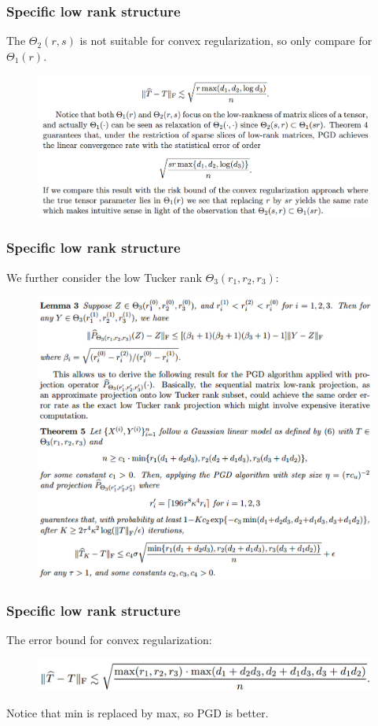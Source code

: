 \documentclass{beamer}
\begin{document}
	\begin{frame}
		\frametitle{Specific low rank structure}
		The $\Theta_2(r,s)$ is not suitable for convex regularization, so only compare for $\Theta_1(r)$.
		\begin{figure}
			\includegraphics[width=1\linewidth]{image029.png}
		\end{figure}
	\end{frame}
	
	\begin{frame}
		\frametitle{Specific low rank structure}
		We further consider the low Tucker rank $\Theta_3(r_1, r_2, r_3)$:
		\begin{figure}
			\includegraphics[width=.7\linewidth]{image030.png}
		\end{figure}
	\end{frame}
	
	
	\begin{frame}
		\frametitle{Specific low rank structure}
		The error bound for convex regularization:
		\begin{figure}
			\includegraphics[width=.7\linewidth]{image031.png}
		\end{figure}
		Notice that min is replaced by max, so PGD is better.
	\end{frame}
	
\end{document}

